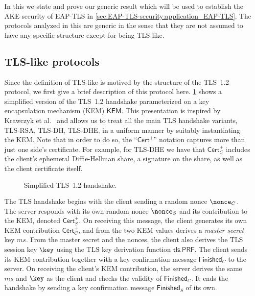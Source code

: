 In this  we state and prove our generic result which will be used to establish the AKE security of EAP-TLS in \cref{sec:EAP-TLS-security:application_EAP-TLS}.
The protocols analyzed in this  are generic in the sense that they are not assumed to have any specific structure except for being TLS-like.

\subsection{TLS-like protocols}\label{sec:TLS-like:def}

Since the definition of TLS-like is motived by the structure of the TLS~1.2 protocol,
we first give a brief description of this protocol here. 
\cref{fig:TLS} shows a simplified version of the TLS~1.2 handshake parameterized on a key encapsulation mechanism (KEM) $\mathsf{KEM}$.
This presentation is inspired by Krawczyk et al.~\cite{C:KraPatWee13}
and allows us to treat all the main TLS handshake variants,
TLS-RSA, TLS-DH, TLS-DHE,
in a uniform manner by suitably instantiating the KEM.
Note that in order to do so,
the ``$\mathsf{Cert}^+$'' notation captures more than just one side's certificate.
For example,
for TLS-DHE we have that $\mathsf{Cert}_C^+$ includes the client's ephemeral Diffie-Hellman share,
a signature on the share,
as well as the client certificate itself.

\begin{figure}
	\centering
	
	\caption{Simplified TLS~1.2 handshake.}
	\label{fig:TLS}
\end{figure}

The TLS handshake begins with the client sending a random nonce $\nonce_{C}$.
The server responds with its own random nonce $\nonce_{S}$ and its contribution to the KEM,
denoted $\mathsf{Cert}_S^+$.
On receiving this message,
the client generates its own KEM contribution $\mathsf{Cert}_C^+$,
and from the two KEM values derives a \emph{master secret} key $ms$. 
From the master secret and the nonces,
the client also derives the TLS session key $\key$
using the TLS key derivation function $\mathsf{tls.PRF}$.
The client sends its KEM contribution together with a key confirmation message $\mathsf{Finished}_C$ to the server.
On receiving the client's KEM contribution,
the server derives the same $ms$ and $\key$ as the client and checks the validity of $\mathsf{Finished}_C$.
It ends the handshake by sending a key confirmation message $\mathsf{Finished}_S$ of its own.
 
